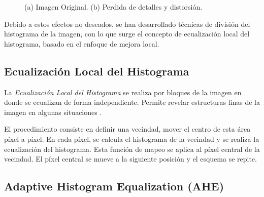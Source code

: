 \begin{figure}[H]
    \captionsetup[figure]{labelformat=empty}
    \centering
    \caption{(a) Imagen Original. (b) Perdida de detalles y distorsión.}
    \label{distorsion}
\end{figure}

Debido a estos efectos no deseados, se han desarrollado técnicas de división del histograma de la imagen, con lo que surge el concepto de ecualización local del histograma, basado en el enfoque de mejora local. 

\subsection{Ecualización Local del Histograma}

La \textit{Ecualización Local del Histograma} se realiza por bloques de la imagen en donde se ecualizan de forma independiente. Permite revelar estructuras finas de la imagen en algunas situaciones \cite{chulwoo2013}.

El procedimiento consiste en definir una vecindad, mover el centro de esta área píxel a píxel. En cada píxel, se calcula el histograma de la vecindad y se realiza la ecualización del histograma. Esta función de mapeo se aplica al píxel central de la vecindad. El píxel central se mueve a la siguiente posición y el esquema se repite.


\subsection{Adaptive Histogram Equalization (AHE)}

